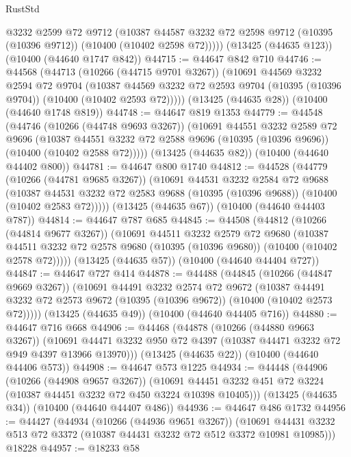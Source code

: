 \begin{lexlean}{RustStd}
\begin{coremodule}
        @3232
        @2599
        @72
        @9712
        (@10387 @44587 @3232 @72 @2598 @9712 (@10395 (@10396 @9712)) (@10400 (@10402 @2598 @72)))))
    (@13425 (@44635 @123))
    (@10400 (@44640 @1747 @842))
@44715 := @44647 @842 @710
@44746 := @44568
    (@44713
      (@10266 (@44715 @9701 @3267))
      (@10691
        @44569
        @3232
        @2594
        @72
        @9704
        (@10387 @44569 @3232 @72 @2593 @9704 (@10395 (@10396 @9704)) (@10400 (@10402 @2593 @72)))))
    (@13425 (@44635 @28))
    (@10400 (@44640 @1748 @819))
@44748 := @44647 @819 @1353
@44779 := @44548
    (@44746
      (@10266 (@44748 @9693 @3267))
      (@10691
        @44551
        @3232
        @2589
        @72
        @9696
        (@10387 @44551 @3232 @72 @2588 @9696 (@10395 (@10396 @9696)) (@10400 (@10402 @2588 @72)))))
    (@13425 (@44635 @82))
    (@10400 (@44640 @44402 @800))
@44781 := @44647 @800 @1740
@44812 := @44528
    (@44779
      (@10266 (@44781 @9685 @3267))
      (@10691
        @44531
        @3232
        @2584
        @72
        @9688
        (@10387 @44531 @3232 @72 @2583 @9688 (@10395 (@10396 @9688)) (@10400 (@10402 @2583 @72)))))
    (@13425 (@44635 @67))
    (@10400 (@44640 @44403 @787))
@44814 := @44647 @787 @685
@44845 := @44508
    (@44812
      (@10266 (@44814 @9677 @3267))
      (@10691
        @44511
        @3232
        @2579
        @72
        @9680
        (@10387 @44511 @3232 @72 @2578 @9680 (@10395 (@10396 @9680)) (@10400 (@10402 @2578 @72)))))
    (@13425 (@44635 @57))
    (@10400 (@44640 @44404 @727))
@44847 := @44647 @727 @414
@44878 := @44488
    (@44845
      (@10266 (@44847 @9669 @3267))
      (@10691
        @44491
        @3232
        @2574
        @72
        @9672
        (@10387 @44491 @3232 @72 @2573 @9672 (@10395 (@10396 @9672)) (@10400 (@10402 @2573 @72)))))
    (@13425 (@44635 @49))
    (@10400 (@44640 @44405 @716))
@44880 := @44647 @716 @668
@44906 := @44468
    (@44878
      (@10266 (@44880 @9663 @3267))
      (@10691 @44471 @3232 @950 @72 @4397 (@10387 @44471 @3232 @72 @949 @4397 @13966 @13970)))
    (@13425 (@44635 @22))
    (@10400 (@44640 @44406 @573))
@44908 := @44647 @573 @1225
@44934 := @44448
    (@44906
      (@10266 (@44908 @9657 @3267))
      (@10691 @44451 @3232 @451 @72 @3224 (@10387 @44451 @3232 @72 @450 @3224 @10398 @10405)))
    (@13425 (@44635 @34))
    (@10400 (@44640 @44407 @486))
@44936 := @44647 @486 @1732
@44956 := @44427
    (@44934
      (@10266 (@44936 @9651 @3267))
      (@10691 @44431 @3232 @513 @72 @3372 (@10387 @44431 @3232 @72 @512 @3372 @10981 @10985)))
    @18228
@44957 := @18233 @58

\end{coremodule}
\end{lexlean}
